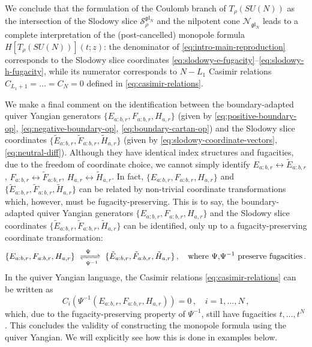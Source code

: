 \documentclass[12pt,a4paper]{article}
\begin{document}
\bigskip

We conclude that the formulation of the Coulomb branch of $T_\rho(SU(N))$ as the intersection of the Slodowy slice $\mathcal{S}^{\mathfrak{gl}_N}_\rho$  and the nilpotent cone $\mathcal{N}_{\mathfrak{gl}_N}$ leads to a complete interpretation of the (post-cancelled) monopole formula $H[T_\rho(SU(N))](t;z)$: the denominator of \eqref{eq:intro-main-reproduction} corresponds to the Slodowy slice coordinates \eqref{eq:slodowy-e-fugacity}--\eqref{eq:slodowy-h-fugacity}, while its numerator corresponds to $N-L_1$ Casimir relations $C_{L_1+1}=\dots=C_N=0$ defined in \eqref{eq:casimir-relations}.

\medskip

We make a final comment on the identification between the boundary-adapted quiver Yangian generators $\{E_{a:b,r},F_{a:b,r},H_{a,r}\}$ (given by \eqref{eq:positive-boundary-op}, \eqref{eq:negative-boundary-op}, \eqref{eq:boundary-cartan-op}) and the Slodowy slice coordinates $\{\tilde{E}_{a:b,r},\tilde{F}_{a:b,r},\tilde H_{a,r}\}$ (given by \eqref{eq:slodowy-coordinate-vectors}, \eqref{eq:neutral-diff}). Although they have identical index structures and fugacities, due to the freedom of coordinate choice, we cannot simply identify $E_{a:b,r}\leftrightarrow \tilde E_{a:b,r}$, $F_{a:b,r}\leftrightarrow \tilde F_{a:b,r}$, $H_{a,r}\leftrightarrow \tilde H_{a,r}$. In fact, $\{E_{a:b,r},F_{a:b,r},H_{a,r}\}$ and $\{\tilde{E}_{a:b,r},\tilde{F}_{a:b,r},\tilde H_{a,r}\}$ can be related by non-trivial coordinate transformations which, however, must be fugacity-preserving. This is to say, the boundary-adapted quiver Yangian generators $\{E_{a:b,r},F_{a:b,r},H_{a,r}\}$ and the Slodowy slice coordinates $\{\tilde{E}_{a:b,r},\tilde{F}_{a:b,r},\tilde H_{a,r}\}$ can be identified, only up to a fugacity-preserving coordinate transformation:
\begin{equation}
    \{E_{a:b,r},F_{a:b,r},H_{a,r}\} \ \xrightleftharpoons[\ \Psi^{-1}]{\Psi\ }\ \{\tilde{E}_{a:b,r},\tilde{F}_{a:b,r},\tilde H_{a,r}\}\,,\quad \text{where $\Psi$,$\Psi^{-1}$ preserve fugacities}\,.
\end{equation}
In the quiver Yangian language, the Casimir relations \eqref{eq:casimir-relations} can be written as 
\begin{equation}
    C_i(\Psi^{-1}(E_{a:b,r},F_{a:b,r},H_{a,r}))=0\,, 
\quad i=1,\dots,N\,,
\end{equation}
which, due to the fugacity-preserving property of $\Psi^{-1}$, still have fugacities $t,\dots,t^N$. This concludes the validity of constructing the monopole formula using the quiver Yangian.
We will explicitly see how this is done in examples below.
\end{document}
